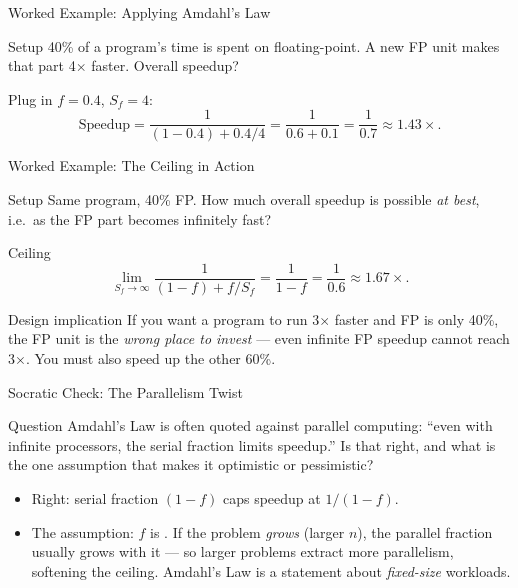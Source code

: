 \documentclass[aspectratio=169]{beamer}
\begin{document}
\begin{frame}{Worked Example: Applying Amdahl's Law}
  \begin{block}{Setup}
    40\% of a program's time is spent on floating-point. A new FP unit makes
    that part 4$\times$ faster. Overall speedup?
  \end{block}
  \begin{exampleblock}{Plug in}
    $f = 0.4$, $S_f = 4$:
    \[
      \text{Speedup} = \frac{1}{(1-0.4) + 0.4/4} = \frac{1}{0.6 + 0.1} =
      \frac{1}{0.7} \approx 1.43\times.
    \]
  \end{exampleblock}
  \vspace{0.2cm}
\end{frame}

\begin{frame}{Worked Example: The Ceiling in Action}
  \begin{block}{Setup}
    Same program, 40\% FP. How much overall speedup is possible \emph{at
    best}, i.e.\ as the FP part becomes infinitely fast?
  \end{block}
  \begin{exampleblock}{Ceiling}
    \[
      \lim_{S_f\to\infty} \frac{1}{(1-f) + f/S_f} = \frac{1}{1-f} =
      \frac{1}{0.6} \approx 1.67\times.
    \]
  \end{exampleblock}
  \begin{alertblock}{Design implication}
    If you want a program to run 3$\times$ faster and FP is only 40\%, the FP
    unit is the \emph{wrong place to invest} --- even infinite FP speedup
    cannot reach 3$\times$. You must also speed up the other 60\%.
  \end{alertblock}
\end{frame}

\begin{frame}{Socratic Check: The Parallelism Twist}
  \begin{alertblock}{Question}
    Amdahl's Law is often quoted against parallel computing: ``even with
    infinite processors, the serial fraction limits speedup.'' Is that right,
    and what is the one assumption that makes it optimistic or pessimistic?
  \end{alertblock}
  \begin{itemize}
    \item Right: serial fraction $(1-f)$ caps speedup at $1/(1-f)$.
    \item The assumption: $f$ is . If the problem \emph{grows}
      (larger $n$), the parallel fraction usually grows with it --- so larger
      problems extract more parallelism, softening the ceiling. Amdahl's Law
      is a statement about \emph{fixed-size} workloads.
  \end{itemize}
\end{frame}
\end{document}
